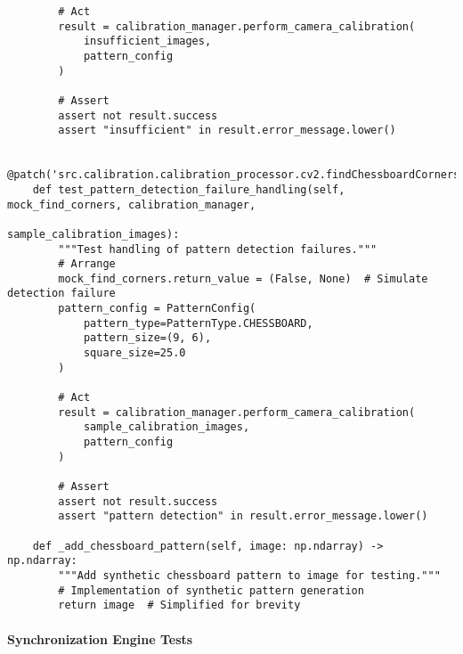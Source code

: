 \documentclass[11pt,a4paper]{report}
\begin{document}
\begin{verbatim}
        # Act
        result = calibration_manager.perform_camera_calibration(
            insufficient_images,
            pattern_config
        )

        # Assert
        assert not result.success
        assert "insufficient" in result.error_message.lower()

    @patch('src.calibration.calibration_processor.cv2.findChessboardCorners')
    def test_pattern_detection_failure_handling(self, mock_find_corners, calibration_manager,
                                                sample_calibration_images):
        """Test handling of pattern detection failures."""
        # Arrange
        mock_find_corners.return_value = (False, None)  # Simulate detection failure
        pattern_config = PatternConfig(
            pattern_type=PatternType.CHESSBOARD,
            pattern_size=(9, 6),
            square_size=25.0
        )

        # Act
        result = calibration_manager.perform_camera_calibration(
            sample_calibration_images,
            pattern_config
        )

        # Assert
        assert not result.success
        assert "pattern detection" in result.error_message.lower()

    def _add_chessboard_pattern(self, image: np.ndarray) -> np.ndarray:
        """Add synthetic chessboard pattern to image for testing."""
        # Implementation of synthetic pattern generation
        return image  # Simplified for brevity
\end{verbatim}

\paragraph{Synchronization Engine Tests}
\end{document}
